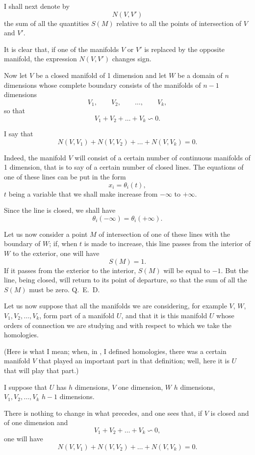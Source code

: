 \documentclass{article}
\begin{document}
I shall next denote by
\[
N(V, V')
\]
the sum of all the quantities $S(M)$ relative to all the points of intersection of $V$ and $V'$.

It is clear that, if one of the manifolds $V$ or $V'$ is replaced by the opposite manifold, the expression $N(V, V')$ changes sign.

Now let $V$ be a closed manifold of 1 dimension and let $W$ be a domain of $n$ dimensions whose complete boundary consists of the manifolds of $n-1$ dimensions
\[
V_{1}, \qquad V_{2}, \qquad \ldots, \qquad V_{k},
\]
so that
\[
V_{1} + V_{2} + \ldots + V_{k} \backsim 0.
\]

I say that
\[
N(V, V_{1}) + N(V, V_{2}) + \ldots + N(V, V_{k}) = 0.
\]

Indeed, the manifold $V$ will consist of a certain number of continuous manifolds of 1 dimension, that is to say of a certain number of closed lines. The equations of one of these lines can be put in the form
\[
x_{i} = \theta_{i}(t),
\]
$t$ being a variable that we shall make increase from $-\infty$ to $+\infty$.

Since the line is closed, we shall have
\[
\theta_{i}(-\infty) = \theta_{i}(+\infty).
\]

Let us now consider a point $M$ of intersection of one of these lines with the boundary of $W$; if, when $t$ is made to increase, this line passes from the interior of $W$ to the exterior, one will have
\[
S(M) = 1.
\]
If it passes from the exterior to the interior, $S(M)$ will be equal to $-1$. But the line, being closed, will return to its point of departure, so that the sum of all the $S(M)$ must be zero. Q.~E.~D.

Let us now suppose that all the manifolds we are considering, for example $V$, $W$, $V_{1}, V_{2}, \ldots, V_{k}$, form part of a manifold $U$, and that it is this manifold $U$ whose orders of connection we are studying and with respect to which we take the homologies.

(Here is what I mean; when, in , I defined homologies, there was a certain manifold $V$ that played an important part in that definition; well, here it is $U$ that will play that part.)

I suppose that $U$ has $h$ dimensions, $V$ one dimension, $W$ $h$ dimensions, $V_{1}, V_{2}, \ldots, V_{k}$ $h-1$ dimensions.

There is nothing to change in what precedes, and one sees that, if $V$ is closed and of one dimension and
\[
V_{1} + V_{2} + \ldots + V_{k} \backsim 0,
\]
one will have
\[
N(V, V_{1}) + N(V, V_{2}) + \ldots + N(V, V_{k}) = 0.
\]
\end{document}
